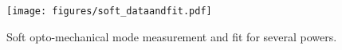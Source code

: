 \begin{figure}
\begin{centering}
\texttt{[image: figures/soft\_dataandfit.pdf]}
\caption{Soft opto-mechanical mode measurement and fit for several
 powers.}
\label{fig:softTF}
\end{centering}
\end{figure}













